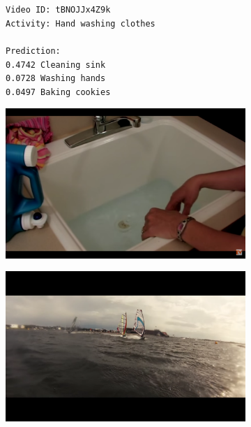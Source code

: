 \begin{figure}[H]
\begin{subfigure}[b]{.4\textwidth}
  \texttt{Video ID: tBNOJJx4Z9k \\
    Activity: Hand washing clothes \\
    \\
    Prediction: \\
    0.4742	Cleaning sink \\
    0.0728	Washing hands \\
    0.0497	Baking cookies \\}
\end{subfigure}%
\begin{subfigure}[b]{.6\textwidth}
  \centering
\includegraphics[width=0.95\linewidth]{img/results/activity_classification/results_visualization_classification_10}
\end{subfigure}

\begin{subfigure}[b]{.4\textwidth}
  \texttt{}
\end{subfigure}%
\begin{subfigure}[b]{.6\textwidth}
  \centering
\includegraphics[width=0.95\linewidth]{img/results/activity_classification/results_visualization_classification_11}
\end{subfigure}


\end{figure}
